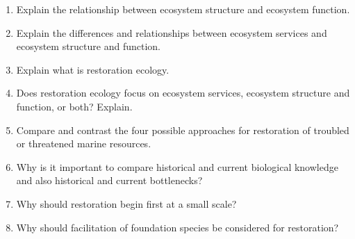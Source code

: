 \documentclass[letterpaper]{tufte-handout}
\newcommand\lecturefile{434_lecture04_instructor}
\begin{document}
\begin{enumerate}

	\item Explain the relationship between ecosystem structure and ecosystem function.
	
	\item Explain the differences and relationships between ecosystem services and ecosystem structure and function.
	
	\item Explain what is restoration ecology. 
	
	\item Does restoration ecology focus on ecosystem services, ecosystem structure and function, or both? Explain.
	
	\item Compare and contrast the four possible approaches for restoration of troubled or threatened marine resources.
	
	\item Why is it important to compare historical and current biological knowledge and also historical and current bottlenecks? 
	
	\item Why should restoration begin first at a small scale?
	
	\item Why should facilitation of foundation species be considered for restoration?
	
		
	
\end{enumerate}
\end{document}
